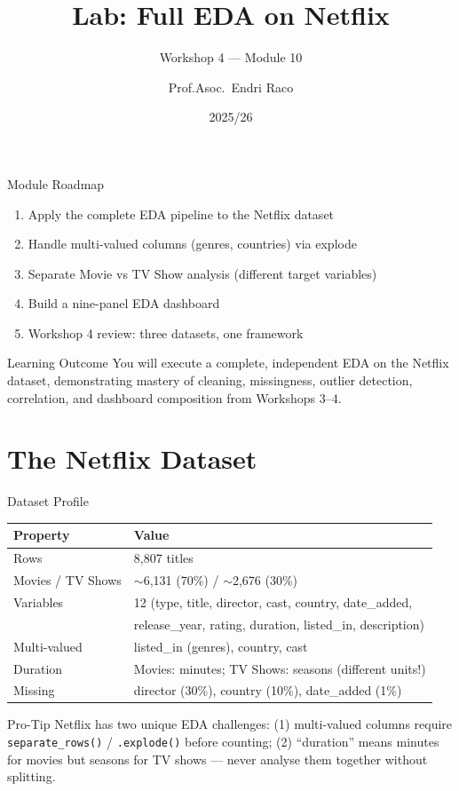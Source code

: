 \documentclass[10pt]{beamer}
\title{Lab: Full EDA on Netflix}
\subtitle{Workshop 4 --- Module 10}
\author{Prof.Asoc.\ Endri Raco}
\institute{Data Visualization for Data Scientists \\ UNYT Tirana}
\date{2025/26}
\begin{document}
\begin{frame}
  \titlepage
\end{frame}

\begin{frame}{Module Roadmap}
  \begin{enumerate}
    \item Apply the complete EDA pipeline to the Netflix dataset
    \item Handle multi-valued columns (genres, countries) via explode
    \item Separate Movie vs TV Show analysis (different target variables)
    \item Build a nine-panel EDA dashboard
    \item Workshop 4 review: three datasets, one framework
  \end{enumerate}
  \begin{exampleblock}{Learning Outcome}
    You will execute a complete, independent EDA on the Netflix dataset,
    demonstrating mastery of cleaning, missingness, outlier detection,
    correlation, and dashboard composition from Workshops 3--4.
  \end{exampleblock}
\end{frame}

\section{The Netflix Dataset}

\begin{frame}{Dataset Profile}
  \centering
  \begin{tabular}{ll}
    \toprule
    \textbf{Property} & \textbf{Value} \\
    \midrule
    Rows & 8,807 titles \\
    Movies / TV Shows & $\sim$6,131 (70\%) / $\sim$2,676 (30\%) \\
    Variables & 12 (type, title, director, cast, country, date\_added, \\
              & release\_year, rating, duration, listed\_in, description) \\
    Multi-valued & listed\_in (genres), country, cast \\
    Duration & Movies: minutes; TV Shows: seasons (different units!) \\
    Missing & director (30\%), country (10\%), date\_added (1\%) \\
    \bottomrule
  \end{tabular}
  \vspace{6pt}
  \begin{alertblock}{Pro-Tip}
    Netflix has two unique EDA challenges: (1) multi-valued columns
    require \texttt{separate\_rows()} / \texttt{.explode()} before
    counting; (2) ``duration'' means minutes for movies but seasons
    for TV shows --- never analyse them together without splitting.
  \end{alertblock}
\end{frame}
\end{document}

